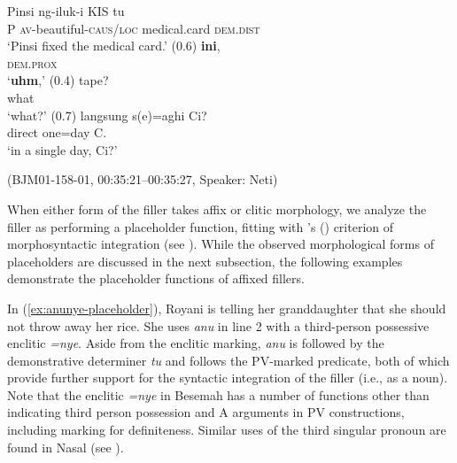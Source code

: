 \documentclass[output=paper,
\ChapterDOI{10.5281/zenodo.15697583}
colorlinks,
citecolor=brown]{langscibook}
\begin{document}
\begin{exe}
    \ex\label{ex:ini-hesitator} 
    \begin{xlist}[0\quad →A:]
        \gll Pinsi ng-iluk-i KIS tu\footnotemark\\
        P \textsc{av}-beautiful-\textsc{caus/loc} medical.card \textsc{dem.dist}\\
        \trans `Pinsi fixed the medical card.'
        \exi{} (0.6)
        \gll  \textbf{ini},\\
        \textsc{dem.prox}\\
        \trans `\textbf{uhm},'
        \exi{} (0.4)
        \exi{3\quad \hphantom{→N:}}
        \gll  tape?\\
        what\\
        \trans `what?'
        \exi{} (0.7)
        \exi{4\quad \hphantom{→N:}}
        \gll  langsung s(e)=aghi Ci?\\
        direct one=day C.\\
        \trans `in a single day, Ci?'
    \end{xlist}
    \hfill (BJM01-158-01, 00:35:21--00:35:27, Speaker: Neti)
\end{exe}


When either form of the filler takes affix or clitic morphology, we analyze the filler as performing a placeholder function, fitting with \citeauthor{hayashi2006crosslinguistic}'s (\citeyear{hayashi2006crosslinguistic}) criterion of morphosyntactic integration (see ). While the observed morphological forms of placeholders are discussed in the next subsection, the following examples demonstrate the placeholder functions of affixed fillers.

In (\ref{ex:anunye-placeholder}), Royani is telling her granddaughter that she should not throw away her rice. She uses \textit{anu} in line 2 with a third-person possessive enclitic \textit{=nye}. Aside from the enclitic marking, \textit{anu} is followed by the demonstrative determiner \textit{tu} and follows the PV-marked predicate, both of which provide further support for the syntactic integration of the filler (i.e., as a noun). Note that the enclitic \textit{=nye} in Besemah has a number of functions other than indicating third person possession and A arguments in PV constructions, including marking for definiteness. Similar uses of the third singular pronoun are found in Nasal (see \cite{chapters/billings_mcdonnell}).  
\end{document}
